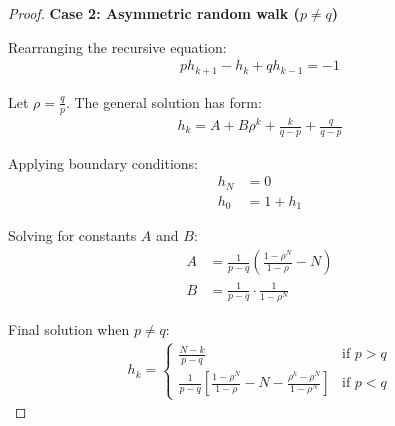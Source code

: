 \documentclass[letterpaper, 11pt]{article}
\newcommand{\1}{\mathds{1}}	%
\theoremstyle{definition}
\begin{document}
\begin{proof}
\textbf{Case 2: Asymmetric random walk ($p \neq q$)}

Rearranging the recursive equation:
\begin{align*}
ph_{k+1} - h_k + qh_{k-1} = -1
\end{align*}

Let $\rho = \frac{q}{p}$. The general solution has form:
\begin{align*}
h_k = A + B\rho^k + \frac{k}{q-p} + \frac{q}{q-p}
\end{align*}

Applying boundary conditions:
\begin{align*}
h_N &= 0\\
h_0 &= 1 + h_1
\end{align*}

Solving for constants $A$ and $B$:
\begin{align*}
A &= \frac{1}{p-q}\left(\frac{1-\rho^N}{1-\rho} - N\right)\\
B &= \frac{1}{p-q} \cdot \frac{1}{1-\rho^N}
\end{align*}

Final solution when $p \neq q$:
\begin{align*}
h_k = \begin{cases}
\frac{N-k}{p-q} & \text{if } p > q\\
\frac{1}{p-q}\left[\frac{1-\rho^N}{1-\rho} - N - \frac{\rho^k-\rho^N}{1-\rho^N}\right] & \text{if } p < q
\end{cases}
\end{align*}
    \end{proof}
\end{document}
